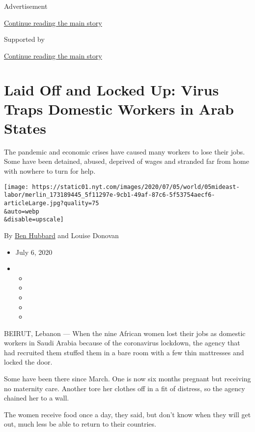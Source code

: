 Advertisement

\protect\hyperlink{after-top}{Continue reading the main story}

Supported by

\protect\hyperlink{after-sponsor}{Continue reading the main story}

\hypertarget{laid-off-and-locked-up-virus-traps-domestic-workers-in-arab-states}{%
\section{Laid Off and Locked Up: Virus Traps Domestic Workers in Arab
States}\label{laid-off-and-locked-up-virus-traps-domestic-workers-in-arab-states}}

The pandemic and economic crises have caused many workers to lose their
jobs. Some have been detained, abused, deprived of wages and stranded
far from home with nowhere to turn for help.

\texttt{[image: https://static01.nyt.com/images/2020/07/05/world/05mideast-labor/merlin\_173189445\_5f11297e-9cb1-49af-87c6-5f53754aecf6-articleLarge.jpg?quality=75\\\&auto=webp\\\&disable=upscale]}

By \href{https://www.nytimes.com/by/ben-hubbard}{Ben Hubbard} and Louise
Donovan

\begin{itemize}
\item
  July 6, 2020
\item
  \begin{itemize}
  \item
  \item
  \item
  \item
  \item
  \end{itemize}
\end{itemize}

BEIRUT, Lebanon --- When the nine African women lost their jobs as
domestic workers in Saudi Arabia because of the coronavirus lockdown,
the agency that had recruited them stuffed them in a bare room with a
few thin mattresses and locked the door.

Some have been there since March. One is now six months pregnant but
receiving no maternity care. Another tore her clothes off in a fit of
distress, so the agency chained her to a wall.

The women receive food once a day, they said, but don't know when they
will get out, much less be able to return to their countries.

